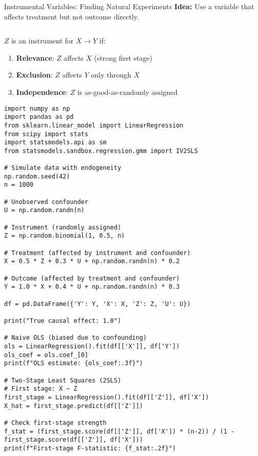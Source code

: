 \documentclass[aspectratio=169,11pt]{beamer}
\begin{document}
\begin{frame}[fragile]{Instrumental Variables: Finding Natural Experiments}
\textbf{Idea:} Use a variable that affects treatment but not outcome directly.

\begin{columns}
\begin{column}{0.55\textwidth}
\begin{definition}
$Z$ is an instrument for $X \rightarrow Y$ if:
\begin{enumerate}
\item \textbf{Relevance}: $Z$ affects $X$ (strong first stage)
\item \textbf{Exclusion}: $Z$ affects $Y$ only through $X$
\item \textbf{Independence}: $Z$ is as-good-as-randomly assigned
\end{enumerate}
\end{definition}

\begin{lstlisting}[basicstyle=\ttfamily\tiny]
import numpy as np
import pandas as pd
from sklearn.linear_model import LinearRegression
from scipy import stats
import statsmodels.api as sm
from statsmodels.sandbox.regression.gmm import IV2SLS

# Simulate data with endogeneity
np.random.seed(42)
n = 1000

# Unobserved confounder
U = np.random.randn(n)

# Instrument (randomly assigned)
Z = np.random.binomial(1, 0.5, n)

# Treatment (affected by instrument and confounder)
X = 0.5 * Z + 0.3 * U + np.random.randn(n) * 0.2

# Outcome (affected by treatment and confounder)
Y = 1.0 * X + 0.4 * U + np.random.randn(n) * 0.3

df = pd.DataFrame({'Y': Y, 'X': X, 'Z': Z, 'U': U})

print("True causal effect: 1.0")

# Naive OLS (biased due to confounding)
ols = LinearRegression().fit(df[['X']], df['Y'])
ols_coef = ols.coef_[0]
print(f"OLS estimate: {ols_coef:.3f}")

# Two-Stage Least Squares (2SLS)
# First stage: X ~ Z
first_stage = LinearRegression().fit(df[['Z']], df['X'])
X_hat = first_stage.predict(df[['Z']])

# Check first-stage strength
f_stat = (first_stage.score(df[['Z']], df['X']) * (n-2)) / (1 - first_stage.score(df[['Z']], df['X']))
print(f"First-stage F-statistic: {f_stat:.2f}")


\end{lstlisting}
\end{column}
\end{columns}
\end{frame}
\end{document}
